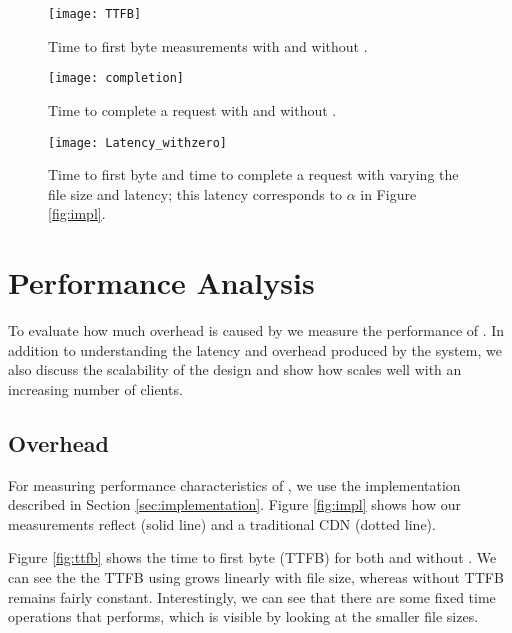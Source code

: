 \begin{figure*}[t!]
\vspace{-2mm}
  \begin{minipage}[t]{.3\linewidth}
    \centering
    \texttt{[image: TTFB]}
    \caption{Time to first byte measurements with and without \system{}.}
    \label{fig:ttfb}
  \end{minipage}
  \hfill
  \begin{minipage}[t]{.3\linewidth}
    \centering
     \texttt{[image: completion]}
    \caption{Time to complete a request with and without \system{}.}
    \label{fig:completion}
  \end{minipage}
  \hfill
  \begin{minipage}[t]{.34\linewidth}
    \centering
    \texttt{[image: Latency\_withzero]}
    \caption{Time to first byte and time to complete a request with varying the file size and latency; this latency 
corresponds to $\alpha$ in Figure \ref{fig:impl}.}
    \label{fig:latency}
  \end{minipage}
\end{figure*}


\section{Performance Analysis}
\label{sec:performance}
To evaluate how much overhead is caused by \system{} we measure the performance 
of \system{}.  In addition to understanding the latency and overhead produced by the 
system, we also discuss the scalability of the design and show how \system{} scales 
well with an increasing number of clients.

\subsection{\system{} Overhead}
For measuring performance characteristics of \system{}, we use the implementation 
described in Section \ref{sec:implementation}.  Figure \ref{fig:impl} shows 
how our measurements reflect \system{} (solid line) and a traditional CDN (dotted 
line).  

Figure \ref{fig:ttfb} shows the time to first byte (TTFB) for both \system{} and 
without \system{}.  We can see the the TTFB using \system{} grows linearly with 
file size, whereas without \system{} TTFB remains fairly constant.  Interestingly, 
we can see that there are some fixed time operations that \system{} performs, which 
is visible by looking at the smaller file sizes.

